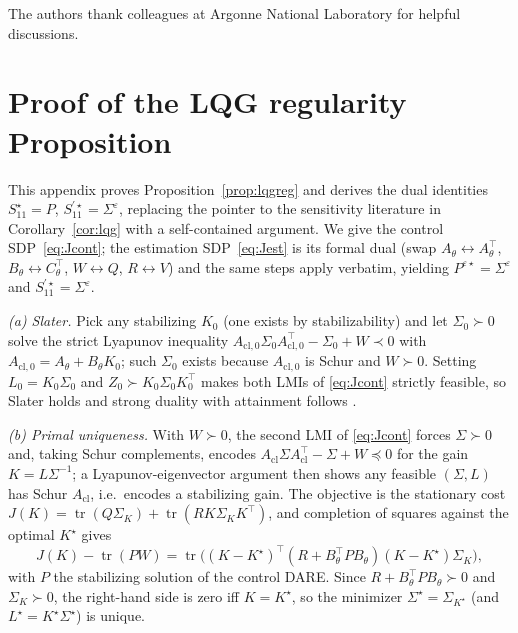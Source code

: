 \documentclass[twocolumn,amsthm]{autart}
\begin{document}
\begin{ack}
The authors thank colleagues at Argonne National Laboratory for helpful
discussions.
\end{ack}

\appendix

\section{Proof of the LQG regularity Proposition}\label{app:lqgreg}

This appendix proves Proposition~\ref{prop:lqgreg} and derives the dual
identities $S_{11}^\star=P$, $S_{11}^{\prime\star}=\Sigma^\varepsilon$, replacing
the pointer to the sensitivity literature in Corollary~\ref{cor:lqg} with a
self-contained argument. We give the control SDP~\eqref{eq:Jcont}; the estimation
SDP~\eqref{eq:Jest} is its formal dual (swap $A_\theta\!\leftrightarrow
A_\theta^\top$, $B_\theta\!\leftrightarrow C_\theta^\top$, $W\!\leftrightarrow Q$,
$R\!\leftrightarrow V$) and the same steps apply verbatim, yielding
$P^{\varepsilon\star}=\Sigma^\varepsilon$ and $S_{11}^{\prime\star}=
\Sigma^\varepsilon$.

\emph{(a) Slater.} Pick any stabilizing $K_0$ (one exists by stabilizability) and
let $\Sigma_0\succ0$ solve the strict Lyapunov inequality $A_{\mathrm{cl},0}
\Sigma_0 A_{\mathrm{cl},0}^\top-\Sigma_0+W\prec0$ with $A_{\mathrm{cl},0}=
A_\theta+B_\theta K_0$; such $\Sigma_0$ exists because $A_{\mathrm{cl},0}$ is
Schur and $W\succ0$. Setting $L_0=K_0\Sigma_0$ and $Z_0\succ K_0\Sigma_0K_0^\top$
makes both LMIs of \eqref{eq:Jcont} strictly feasible, so Slater holds and strong
duality with attainment follows \cite{boyd2004convex}.

\emph{(b) Primal uniqueness.} With $W\succ0$, the second LMI of \eqref{eq:Jcont}
forces $\Sigma\succ0$ and, taking Schur complements, encodes
$A_{\mathrm{cl}}\Sigma A_{\mathrm{cl}}^\top-\Sigma+W\preceq0$ for the gain
$K=L\Sigma^{-1}$; a Lyapunov-eigenvector argument then shows any feasible
$(\Sigma,L)$ has Schur $A_{\mathrm{cl}}$, i.e.\ encodes a stabilizing gain. The
objective is the stationary cost $J(K)=\operatorname{tr}(Q\Sigma_K)+
\operatorname{tr}(RK\Sigma_KK^\top)$, and completion of squares against the
optimal $K^\star$ gives
\begin{equation}\label{eq:cos}
J(K)-\operatorname{tr}(PW)=\operatorname{tr}\!\big((K-K^\star)^\top
(R+B_\theta^\top PB_\theta)(K-K^\star)\Sigma_K\big),
\end{equation}
with $P$ the stabilizing solution of the control DARE. Since $R+B_\theta^\top
PB_\theta\succ0$ and $\Sigma_K\succ0$, the right-hand side is zero iff
$K=K^\star$, so the minimizer $\Sigma^\star=\Sigma_{K^\star}$ (and
$L^\star=K^\star\Sigma^\star$) is unique.
\end{document}
